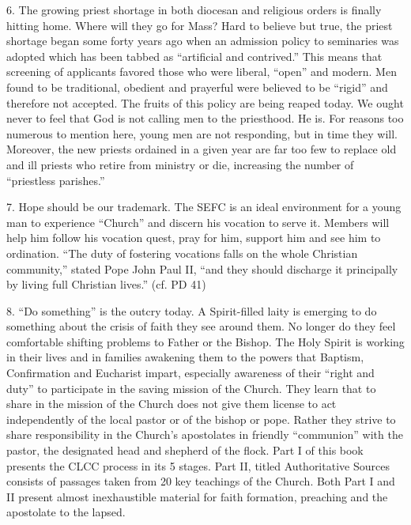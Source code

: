 \documentclass[oneside]{book}
\begin{document}
6. The growing priest shortage in both diocesan and religious orders is finally
hitting home. Where will they go for Mass? Hard to believe but true, the priest
shortage began some forty years ago when an admission policy to seminaries was
adopted which has been tabbed as ``artificial and contrived.'' This means that
screening of applicants favored those who were liberal, ``open'' and modern. Men
found to be traditional, obedient and prayerful were believed to be ``rigid''
and therefore not accepted. The fruits of this policy are being reaped today. We
ought never to feel that God is not calling men to the priesthood. He is. For
reasons too numerous to mention here, young men are not responding, but in time
they will. Moreover, the new priests ordained in a given year are far too few to
replace old and ill priests who retire from ministry or die, increasing the
number of ``priestless parishes.''

7. Hope should be our trademark. The SEFC is an ideal environment for a young
man to experience ``Church'' and discern his vocation to serve it. Members will
help him follow his vocation quest, pray for him, support him and see him to
ordination. ``The duty of fostering vocations falls on the whole Christian
community,'' stated Pope John Paul II, ``and they should discharge it
principally by living full Christian lives.'' (cf. PD 41)

8. ``Do something'' is the outcry today. A Spirit-filled laity is emerging to do
something about the crisis of faith they see around them. No longer do they feel
comfortable shifting problems to Father or the Bishop. The Holy Spirit is
working in their lives and in families awakening them to the powers that
Baptism, Confirmation and Eucharist impart, especially awareness of their
``right and duty'' to participate in the saving mission of the Church. They
learn that to share in the mission of the Church does not give them license to
act independently of the local pastor or of the bishop or pope. Rather they
strive to share responsibility in the Church's apostolates in friendly
``communion'' with the pastor, the designated head and shepherd of the flock.
Part I of this book presents the CLCC process in its 5 stages. Part II, titled
Authoritative Sources consists of passages taken from 20 key teachings of the
Church. Both Part I and II present almost inexhaustible material for faith
formation, preaching and the apostolate to the lapsed.

\end{document}

